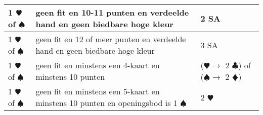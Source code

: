 \documentclass[12pt,a4paper]{report}
\begin{document}
\begin{tabular}{|l|p{7cm}|p{6.5cm}|}
	1 $\varheartsuit$ of $\spadesuit$
	& geen fit\newline
	  en 10-11 punten \newline
	  en verdeelde hand \newline
	  en geen biedbare hoge kleur
	& 2 SA \\ 
	\hline 
	
	1 $\varheartsuit$ of $\spadesuit$
	& geen fit\newline
	  en 12 of meer punten \newline
	  en verdeelde hand \newline
	  en geen biedbare hoge kleur & 3 SA  \\ 
	\hline 
	
	1 $\varheartsuit$ of $\spadesuit$
	& geen fit\newline
	  en minstens een 4-kaart \newline
	  en minstens 10 punten
    & ($\varheartsuit \rightarrow$ 2 $\clubsuit$) of \newline
	  ($\spadesuit \rightarrow $ 2 $\vardiamondsuit)$\\
	\hline 
	
	1 $\varheartsuit$ of $\spadesuit$
	& geen fit\newline
	  en minstens een 5-kaart\newline
	  en minstens 10 punten\newline 
	  en openingsbod is 1 $\spadesuit$ & 2 $\varheartsuit$ \\ 
	\hline 
\end{tabular}

\newpage
\end{document}
